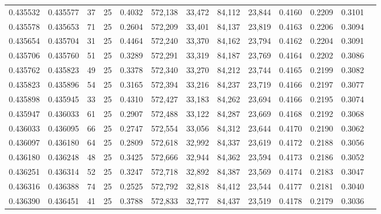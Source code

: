 \begin{tabular}{rrrrrrrrrrrrr}
0.435532 & 0.435577 &    37 &  25 &                                     0.4032 & 572,138 &  33,472 &  84,112 &  23,844 & 0.4160 & 0.2209 & 0.3101 \\
0.435578 & 0.435653 &    71 &  25 &                                     0.2604 & 572,209 &  33,401 &  84,137 &  23,819 & 0.4163 & 0.2206 & 0.3094 \\
0.435654 & 0.435704 &    31 &  25 &                                     0.4464 & 572,240 &  33,370 &  84,162 &  23,794 & 0.4162 & 0.2204 & 0.3091 \\
0.435706 & 0.435760 &    51 &  25 &                                     0.3289 & 572,291 &  33,319 &  84,187 &  23,769 & 0.4164 & 0.2202 & 0.3086 \\
0.435762 & 0.435823 &    49 &  25 &                                     0.3378 & 572,340 &  33,270 &  84,212 &  23,744 & 0.4165 & 0.2199 & 0.3082 \\
0.435823 & 0.435896 &    54 &  25 &                                     0.3165 & 572,394 &  33,216 &  84,237 &  23,719 & 0.4166 & 0.2197 & 0.3077 \\
0.435898 & 0.435945 &    33 &  25 &                                     0.4310 & 572,427 &  33,183 &  84,262 &  23,694 & 0.4166 & 0.2195 & 0.3074 \\
0.435947 & 0.436033 &    61 &  25 &                                     0.2907 & 572,488 &  33,122 &  84,287 &  23,669 & 0.4168 & 0.2192 & 0.3068 \\
0.436033 & 0.436095 &    66 &  25 &                                     0.2747 & 572,554 &  33,056 &  84,312 &  23,644 & 0.4170 & 0.2190 & 0.3062 \\
0.436097 & 0.436180 &    64 &  25 &                                     0.2809 & 572,618 &  32,992 &  84,337 &  23,619 & 0.4172 & 0.2188 & 0.3056 \\
0.436180 & 0.436248 &    48 &  25 &                                     0.3425 & 572,666 &  32,944 &  84,362 &  23,594 & 0.4173 & 0.2186 & 0.3052 \\
0.436251 & 0.436314 &    52 &  25 &                                     0.3247 & 572,718 &  32,892 &  84,387 &  23,569 & 0.4174 & 0.2183 & 0.3047 \\
0.436316 & 0.436388 &    74 &  25 &                                     0.2525 & 572,792 &  32,818 &  84,412 &  23,544 & 0.4177 & 0.2181 & 0.3040 \\
0.436390 & 0.436451 &    41 &  25 &                                     0.3788 & 572,833 &  32,777 &  84,437 &  23,519 & 0.4178 & 0.2179 & 0.3036 \\

\end{tabular}
